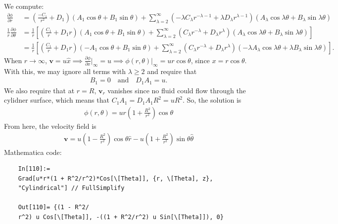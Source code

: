 \documentclass{article}
\theoremstyle{definition}
\newcommand{\p}{\partial}
\newcommand{\f}[2]{\frac{#1}{#2}}
\newcommand{\lp}{\left(}
\newcommand{\rp}{\right)}
\newcommand{\lb}{\left[}
\newcommand{\rb}{\right]}
\begin{document}
\begin{enumerate}[label=(\alph*)]
	We compute:
	\begin{align*}
	\f{\p \phi}{\p r} &= \lp \f{-C_1}{r^2} + D_1 \rp 
	(A_1 \cos\theta + B_1 \sin\theta) 
	+ \sum_{\lambda = 2}^\infty (-\lambda C_\lambda r^{-\lambda-1} + \lambda D_\lambda r^{\lambda-1}) (A_\lambda\cos\lambda\theta + B_\lambda\sin\lambda\theta)\\
	\f{1}{r}\f{\p \phi}{\p \theta} &=  \f{1}{r}\lb \lp \f{C_1}{r} + D_1r \rp(A_1 \cos\theta + B_1 \sin\theta) + \sum_{\lambda = 2}^\infty (C_\lambda r^{-\lambda} + D_\lambda r^{\lambda}) (A_\lambda\cos\lambda\theta + B_\lambda\sin\lambda\theta) \rb \\
	&= \f{1}{r}\lb \lp \f{C_1}{r} + D_1r \rp
	(-A_1 \cos\theta + B_1 \sin\theta) + \sum_{\lambda = 2}^\infty (C_\lambda r^{-\lambda} + D_\lambda r^{\lambda}) (-\lambda A_\lambda\cos\lambda\theta + \lambda B_\lambda\sin\lambda\theta) \rb.
	\end{align*}
	When $r\to \infty$, $\mathbf{v} = u \hat{x} \implies \f{\p \phi}{\p x}\big\vert_\infty = u \implies \phi(r,\theta)\big\vert_\infty = u r \cos\theta$, since $x = r\cos\theta$. With this, we may ignore all terms with $\lambda \geq 2$ and require that
	\begin{align*}
	B_1 = 0 \quad \text{and} \quad D_1 A_1 = u.	
	\end{align*}
	We also require that at $r=R$, $\mathbf{v}_r$ vanishes since no fluid could flow through the cylidner surface, which means that $C_1 A_1 = D_1 A_1 R^2 = uR^2$. So, the solution is 
	\begin{align*}
	\boxed{\phi(r,\theta) = u r \lp 1 + \f{R^2}{r^2} \rp\cos\theta}
	\end{align*}
	From here, the velocity field is 
	\begin{align*}
	\boxed{\mathbf{v} = u\lp 1 - \f{R^2}{r^2} \rp \cos\theta \hat{r} 
		- u \lp 1 + \f{R^2}{r^2}\rp\sin\theta \hat{\theta}}
	\end{align*}
	Mathematica code:
	\begin{lstlisting}
	In[110]:= 
	Grad[u*r*(1 + R^2/r^2)*Cos[\[Theta]], {r, \[Theta], z}, 
	"Cylindrical"] // FullSimplify
	
	Out[110]= {(1 - R^2/
	r^2) u Cos[\[Theta]], -((1 + R^2/r^2) u Sin[\[Theta]]), 0}
	\end{lstlisting}
	
	
	

\end{enumerate}
\end{document}
